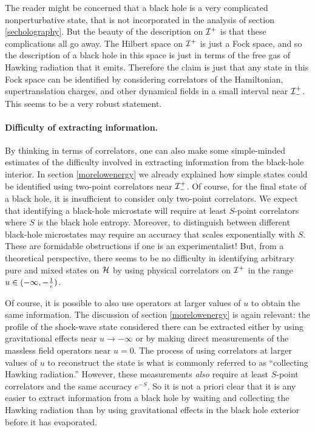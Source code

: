 \documentclass[12pt]{article}
\def \scrip{{\cal I}^{+}}
\def \scrippast{{\cal I}^{+}_{-}}
\begin{document}
The reader might be concerned that a black hole is a very complicated nonperturbative state, that is not incorporated in the analysis of section \ref{secholography}.  But the beauty of  the description on $\scrip$ is that these complications all go away. The Hilbert space on $\scrip$ is just a Fock space, and so the description of a black hole in this space is just in terms of the free gas of Hawking radiation that it emits.  Therefore the claim
is just that any state in this Fock space can be identified by considering correlators of the Hamiltonian, supertranslation charges, and other dynamical fields in a small interval near $\scrippast$.   This seems to be a very robust statement.

\paragraph{\bf Difficulty of extracting information.} By thinking in terms of correlators, one can also make some simple-minded estimates of the difficulty involved in extracting information from the black-hole interior.  In  section \ref{morelowenergy} we already explained how simple states could be identified using two-point correlators near $\scrippast$.  Of course, for the final state of a black hole, it is insufficient to consider only two-point correlators. We expect that identifying a black-hole microstate will require at least $S$-point correlators where $S$ is the black hole entropy. Moreover, to distinguish between different black-hole microstates may require an accuracy that scales exponentially with $S$. These are formidable obstructions if one is an experimentalist! But, from a theoretical perspective, there seems to be no difficulty in identifying arbitrary pure and mixed states on ${\cal H}$ by using physical correlators on $\scrip$ in the range $u \in (-\infty, -{1 \over \epsilon})$.

Of course, it is possible to also use operators at larger values of $u$ to obtain the same information. The discussion of section \ref{morelowenergy} is again relevant: the profile of the shock-wave state considered there can be extracted either by using gravitational effects near $u \rightarrow -\infty$ or by making direct measurements of the massless field operators near $u = 0$. The process of using correlators at larger values of $u$ to reconstruct the state is what is commonly referred to as ``collecting Hawking radiation.'' However, these measurements {\em also} require at least $S$-point correlators and the same accuracy $e^{-S}$. So it is not a priori clear that it is any easier to extract information from a black hole by waiting and collecting the Hawking radiation than by using gravitational effects in the black hole exterior before it has evaporated.
\end{document}
